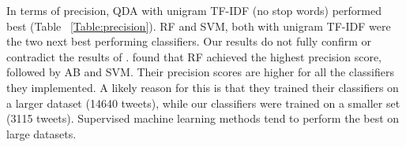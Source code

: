 In terms of precision, QDA with unigram TF-IDF (no stop words) performed best (Table ~\ref{Table:precision}). RF and SVM, both with unigram TF-IDF  were the two next best performing classifiers. Our results do not fully confirm or contradict the results of \cite{Rane2018}. \cite{Rane2018} found that RF achieved the highest precision score, followed by AB and SVM. Their precision scores are higher for all the classifiers they implemented. A likely reason for this is that they trained their classifiers on a larger dataset (14640 tweets), while our classifiers were trained on a smaller set (3115 tweets). Supervised machine learning methods tend to perform the best on large datasets.

\begin{table}[h!]
\setlength{\tabcolsep}{3pt}
\caption{Recall of Classifiers and Feature Representations.}
\label{Table:recall}
\end{table}
